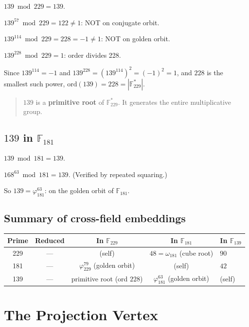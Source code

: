 $139 \bmod 229 = 139$.

$139^{57} \bmod 229 = 122 \neq 1$: NOT on conjugate orbit.

$139^{114} \bmod 229 = 228 = -1 \neq 1$: NOT on golden orbit.

$139^{228} \bmod 229 = 1$: order divides 228.

Since $139^{114} = -1$ and $139^{228} = (139^{114})^2 = (-1)^2 = 1$,
and $228$ is the smallest such power, $\mathrm{ord}(139) = 228 = |\mathbb{F}_{229}^*|$.

\begin{quote}
$139$ is a \textbf{primitive root} of $\mathbb{F}_{229}^*$.
It generates the entire multiplicative group.
\end{quote}

\subsection{$139$ in $\mathbb{F}_{181}$}

$139 \bmod 181 = 139$.

$168^{63} \bmod 181 = 139$. (Verified by repeated squaring.)

So $139 = \varphi_{181}^{63}$: on the golden orbit of $\mathbb{F}_{181}$.

\subsection{Summary of cross-field embeddings}

\begin{center}
\begin{tabular}{@{}ccccl@{}}
\toprule
Prime & Reduced & In $\mathbb{F}_{229}$ & In $\mathbb{F}_{181}$ & In $\mathbb{F}_{139}$ \\
\midrule
229 & --- & (self) & $48 = \omega_{181}$ (cube root) & $90$ \\
181 & --- & $\varphi_{229}^{79}$ (golden orbit) & (self) & $42$ \\
139 & --- & primitive root (ord $228$) & $\varphi_{181}^{63}$ (golden orbit) & (self) \\
\bottomrule
\end{tabular}
\end{center}

\section{The Projection Vertex}
\label{sec:projection}


